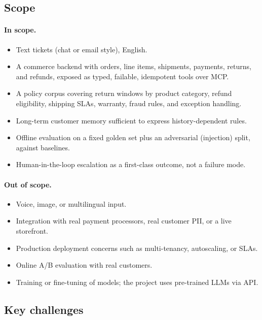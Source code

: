 \documentclass[11pt,a4paper]{article}
\begin{document}
\subsection{Scope}

\paragraph{In scope.}
\begin{itemize}
  \item Text tickets (chat or email style), English.
  \item A commerce backend with orders, line items, shipments, payments, returns, and refunds, exposed as typed, failable, idempotent tools over MCP.
  \item A policy corpus covering return windows by product category, refund eligibility, shipping SLAs, warranty, fraud rules, and exception handling.
  \item Long-term customer memory sufficient to express history-dependent rules.
  \item Offline evaluation on a fixed golden set plus an adversarial (injection) split, against baselines.
  \item Human-in-the-loop escalation as a first-class outcome, not a failure mode.
\end{itemize}

\paragraph{Out of scope.}
\begin{itemize}
  \item Voice, image, or multilingual input.
  \item Integration with real payment processors, real customer PII, or a live storefront.
  \item Production deployment concerns such as multi-tenancy, autoscaling, or SLAs.
  \item Online A/B evaluation with real customers.
  \item Training or fine-tuning of models; the project uses pre-trained LLMs via API.
\end{itemize}

\subsection{Key challenges}
\end{document}
